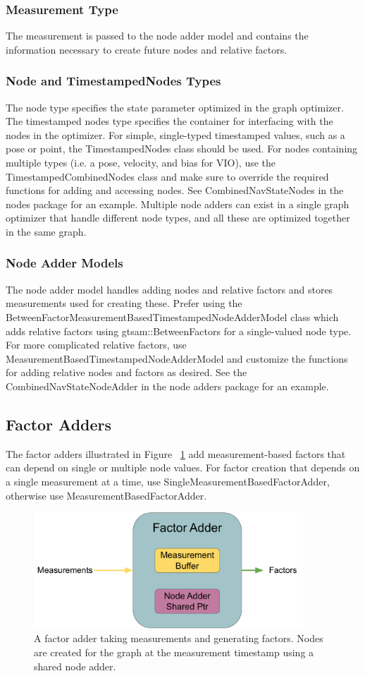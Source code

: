 \subsubsection{Measurement Type}
The measurement is passed to the node adder model and contains the information necessary to create future nodes and relative factors.
\subsubsection{Node and TimestampedNodes Types}
The node type specifies the state parameter optimized in the graph optimizer.
The timestamped nodes type specifies the container for interfacing with the nodes in the optimizer.
For simple, single-typed timestamped values, such as a pose or point, the TimestampedNodes class should be used.
For nodes containing multiple types (i.e. a pose, velocity, and bias for VIO), use the TimestampedCombinedNodes class and make sure to override the required functions for adding and accessing nodes.
See CombinedNavStateNodes in the nodes package for an example.
Multiple node adders can exist in a single graph optimizer that handle different node types, and all these are optimized together in the same graph.
\subsubsection{Node Adder Models}
The node adder model handles adding nodes and relative factors and stores measurements used for creating these. 
Prefer using the BetweenFactorMeasurementBasedTimestampedNodeAdderModel class which adds relative factors using gtsam::BetweenFactors for a single-valued node type.
For more complicated relative factors, use MeasurementBasedTimestampedNodeAdderModel and customize the functions for adding relative nodes and factors as desired.
See the CombinedNavStateNodeAdder in the node adders package for an example.
\subsection{Factor Adders}
The factor adders illustrated in Figure ~\ref{img:factor_adder} add measurement-based factors that can depend on single or multiple node values.
For factor creation that depends on a single measurement at a time, use SingleMeasurementBasedFactorAdder, otherwise use MeasurementBasedFactorAdder.
\begin{figure}[h]
    \centering
\includegraphics[width=0.9\textwidth]{factor_adder.pdf}
 \caption{A factor adder taking measurements and generating factors. Nodes are created for the graph at the measurement timestamp using a shared node adder.}
  \label{img:factor_adder}
\end{figure}